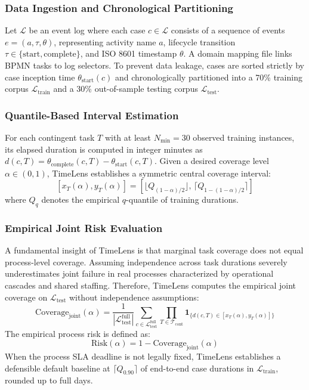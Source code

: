 \documentclass[conference]{IEEEtran}
\begin{document}
\subsubsection{Data Ingestion and Chronological Partitioning}
Let $\mathcal{L}$ be an event log where each case $c \in \mathcal{L}$ consists of a sequence of events $e = (a, \tau, \theta)$, representing activity name $a$, lifecycle transition $\tau \in \{\text{start}, \text{complete}\}$, and ISO 8601 timestamp $\theta$. A domain mapping file links BPMN tasks to log selectors. To prevent data leakage, cases are sorted strictly by case inception time $\theta_{\text{start}}(c)$ and chronologically partitioned into a 70\% training corpus $\mathcal{L}_{\text{train}}$ and a 30\% out-of-sample testing corpus $\mathcal{L}_{\text{test}}$.

\subsubsection{Quantile-Based Interval Estimation}
For each contingent task $T$ with at least $N_{\text{min}} = 30$ observed training instances, its elapsed duration is computed in integer minutes as $d(c, T) = \theta_{\text{complete}}(c, T) - \theta_{\text{start}}(c, T)$. Given a desired coverage level $\alpha \in (0, 1)$, TimeLens establishes a symmetric central coverage interval:
\begin{equation}
\label{eq:quantile}
[x_T(\alpha), y_T(\alpha)] = \left[ \lfloor Q_{(1-\alpha)/2} \rfloor, \, \lceil Q_{1 - (1-\alpha)/2} \rceil \right]
\end{equation}
where $Q_q$ denotes the empirical $q$-quantile of training durations.

\subsubsection{Empirical Joint Risk Evaluation}
A fundamental insight of TimeLens is that marginal task coverage does not equal process-level coverage. Assuming independence across task durations severely underestimates joint failure in real processes characterized by operational cascades and shared staffing. Therefore, TimeLens computes the empirical joint coverage on $\mathcal{L}_{\text{test}}$ without independence assumptions:
\begin{equation}
\label{eq:joint_coverage}
\text{Coverage}_{\text{joint}}(\alpha) = \frac{1}{|\mathcal{L}_{\text{test}}^{\text{full}}|} \sum_{c \in \mathcal{L}_{\text{test}}^{\text{full}}} \prod_{T \in \mathcal{T}_{\text{cont}}} \mathbf{1}_{\{d(c, T) \in [x_T(\alpha), y_T(\alpha)]\}}
\end{equation}
The empirical process risk is defined as:
\begin{equation}
\text{Risk}(\alpha) = 1 - \text{Coverage}_{\text{joint}}(\alpha)
\end{equation}
When the process SLA deadline is not legally fixed, TimeLens establishes a defensible default baseline at $\lceil Q_{0.90} \rceil$ of end-to-end case durations in $\mathcal{L}_{\text{train}}$, rounded up to full days.
\end{document}
